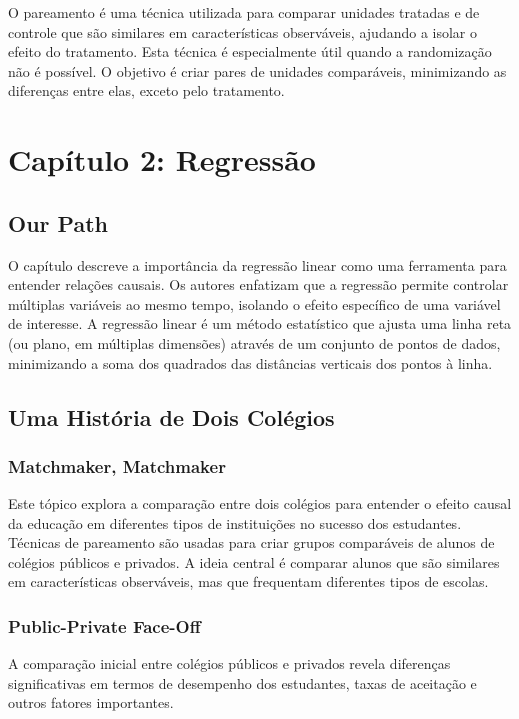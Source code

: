 \documentclass[a4paper,12pt]{article}[abntex2]
\begin{document}
O pareamento é uma técnica utilizada para comparar unidades tratadas e de controle que são similares em características observáveis, ajudando a isolar o efeito do tratamento. Esta técnica é especialmente útil quando a randomização não é possível. O objetivo é criar pares de unidades comparáveis, minimizando as diferenças entre elas, exceto pelo tratamento.

\newpage

\section{Capítulo 2: Regressão}

\subsection*{Our Path}

O capítulo descreve a importância da regressão linear como uma ferramenta para entender relações causais. Os autores enfatizam que a regressão permite controlar múltiplas variáveis ao mesmo tempo, isolando o efeito específico de uma variável de interesse. A regressão linear é um método estatístico que ajusta uma linha reta (ou plano, em múltiplas dimensões) através de um conjunto de pontos de dados, minimizando a soma dos quadrados das distâncias verticais dos pontos à linha.

\subsection{Uma História de Dois Colégios}

\subsubsection*{Matchmaker, Matchmaker}

Este tópico explora a comparação entre dois colégios para entender o efeito causal da educação em diferentes tipos de instituições no sucesso dos estudantes. Técnicas de pareamento são usadas para criar grupos comparáveis de alunos de colégios públicos e privados. A ideia central é comparar alunos que são similares em características observáveis, mas que frequentam diferentes tipos de escolas.

\subsubsection*{Public-Private Face-Off}

A comparação inicial entre colégios públicos e privados revela diferenças significativas em termos de desempenho dos estudantes, taxas de aceitação e outros fatores importantes.
\end{document}
